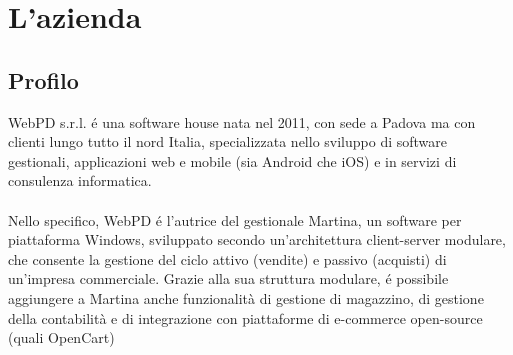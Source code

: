 
\chapter{L'azienda}
\label{cap:processi-metodologie}

\section{Profilo}
WebPD s.r.l. é una software house nata nel 2011, con sede a Padova ma con clienti lungo tutto il nord Italia, specializzata nello sviluppo di software gestionali, applicazioni web e mobile (sia Android che iOS) e in servizi di consulenza informatica.\\\\
Nello specifico, WebPD é l'autrice del gestionale Martina, un software per piattaforma Windows, sviluppato secondo un'architettura client-server modulare, che consente la gestione del ciclo attivo (vendite) e passivo (acquisti) di un'impresa commerciale. Grazie alla sua struttura modulare, é possibile aggiungere a Martina anche funzionalità di gestione di magazzino, di gestione della contabilità e di integrazione con piattaforme di e-commerce open-source (quali OpenCart)\\